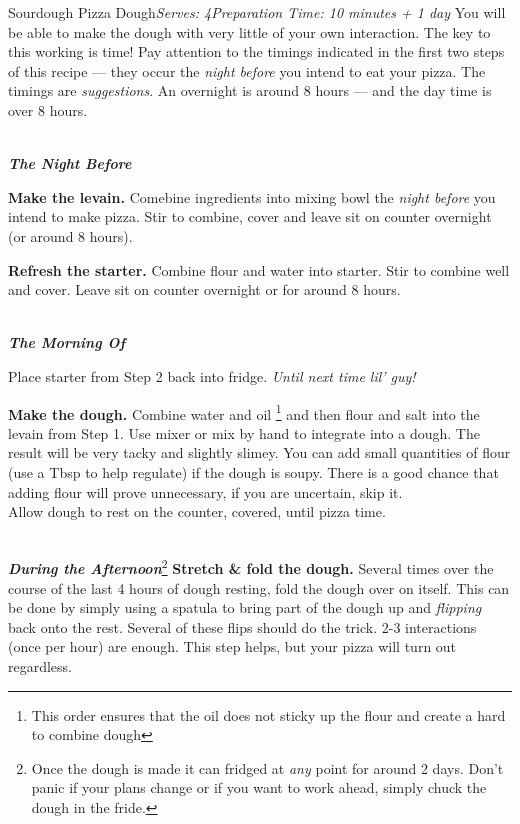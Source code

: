 \documentclass{article}
\begin{document}
\begin{recipe}{Sourdough Pizza Dough}{\textit{Serves: 4}}{\textit{Preparation Time: 10 minutes + 1 day}}
  \freeform
    You will be able to make the dough with very little of your own interaction.
    The key  to this working is time!
    Pay attention to the timings indicated in the first two steps of this recipe --- they occur the \textit{night before} you intend to eat your pizza.
    The timings are \textit{suggestions}. An overnight is around 8 hours --- and the day time is over 8 hours.

  \freeform
    \\
    \textbf{\textit{The Night Before}}

  \textbf{Make the levain.}
  Comebine ingredients into mixing bowl the \textit{night before} you intend to make pizza.
  Stir to combine, cover and leave sit on counter overnight (or around 8 hours).
  
  \textbf{Refresh the starter.}
  Combine flour and water into starter.
  Stir to combine well and cover.
  Leave sit on counter overnight or for around 8 hours.

  \freeform
    \\
    \textbf{\textit{The Morning Of}}

  \newstep
    Place starter from Step 2 back into fridge. \textit{Until next time lil' guy!}

  \textbf{Make the dough.}
  Combine water and oil
    \footnote{This order ensures that the oil does not sticky up the flour and create a hard to combine dough}
  and then flour and salt into the levain from Step 1.
  Use mixer or mix by hand to integrate into a dough.
  The result will be very tacky and slightly slimey.
  You can add small quantities of flour (use a Tbsp to help regulate) if the dough is soupy.
  There is a good chance that adding flour will prove unnecessary, if you are uncertain, skip it.
  \\
  Allow dough to rest on the counter, covered, until pizza time.
 
  \freeform
    \\
    \textbf{\textit{During the Afternoon}}\footnote{
      Once the dough is made it can fridged at \textit{any} point for around 2 days.
      Don't panic if your plans change or if you want to work ahead, simply chuck the dough in the fride.
    }
  \newstep
    \textbf{Stretch \& fold the dough.}
    Several times over the course of the last 4 hours of dough resting, fold the dough over on itself.
    This can be done by simply using a spatula to bring part of the dough up and \textit{flipping} back onto the rest.
    Several of these flips should do the trick.
    2-3 interactions (once per hour) are enough.
    This step helps, but your pizza will turn out regardless.


\end{recipe}
\end{document}
